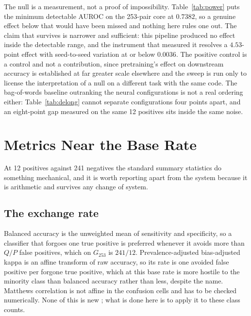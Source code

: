The null is a measurement, not a proof of impossibility. Table~\ref{tab:power}
puts the minimum detectable AUROC on the 253-pair core at $0.7382$, so a genuine
effect below that would have been missed and nothing here rules one out. The
claim that survives is narrower and sufficient: this pipeline produced no effect
inside the detectable range, and the instrument that measured it resolves a
$4.53$-point effect with seed-to-seed variation at or below $0.0036$. The
positive control is a control and not a contribution, since pretraining's effect
on downstream accuracy is established at far greater scale elsewhere and the
sweep is run only to license the interpretation of a null on a different task
with the same code. The bag-of-words baseline outranking the neural
configurations is not a real ordering either: Table~\ref{tab:delong} cannot
separate configurations four points apart, and an eight-point gap measured on the
same 12 positives sits inside the same noise.

\section{Metrics Near the Base Rate}
\label{sec:res-metrics}

At 12 positives against 241 negatives the standard summary statistics do
something mechanical, and it is worth reporting apart from the system because it
is arithmetic and survives any change of system.

\subsection{The exchange rate}

Balanced accuracy \citep{brodersen2010balanced} is the unweighted mean of
sensitivity and specificity, so a classifier that forgoes one true positive is
preferred whenever it avoids more than $Q/P$ false positives, which on $G_{253}$
is $241/12$. Prevalence-adjusted bias-adjusted kappa \citep{byrt1993pabak} is an
affine transform of raw accuracy, so its rate is one avoided false positive per
forgone true positive, which at this base rate is more hostile to the minority
class than balanced accuracy rather than less, despite the name. Matthews
correlation \citep{matthews1975mcc} is not affine in the confusion cells and has
to be checked numerically. None of this is new
\citep{feinstein1990paradoxes,cicchetti1990resolving,delgado2019kappa}; what is
done here is to apply it to these class counts.

